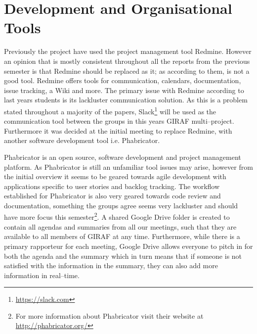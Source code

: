 \section{Development and Organisational Tools}
Previously the project have used the project management tool Redmine.
However an opinion that is mostly consistent throughout all the reports from the previous semester is that Redmine should be replaced as it;
as according to them, is not a good tool.
Redmine offers tools for communication, calendars, documentation, issue tracking, a Wiki and more.
The primary issue with Redmine according to last years students is its lackluster communication solution.
As this is a problem stated throughout a majority of the papers, Slack\footnote{\url{https://slack.com}} will be used as the communication tool between the groups in this years GIRAF multi--project.
Furthermore it was decided at the initial meeting to replace Redmine, with another software development tool i.e. Phabricator.

Phabricator is an open source, software development and project management platform.
As Phabricator is still an unfamiliar tool issues may arise, however from the initial overview it seems to be geared towards agile development with applications specific to user stories and backlog tracking.
The workflow established for Phabricator is also very geared towards code review and documentation, something the groups agree seems very lackluster and should have more focus this semester\footnote{For more information about Phabricator visit their website at \url{http://phabricator.org/}}.
A shared Google Drive folder is created to contain all agendas and summaries from all our meetings, such that they are available to all members of GIRAF at any time.
Furthermore, while there is a primary rapporteur for each meeting, Google Drive allows everyone to pitch in for both the agenda and the summary which in turn means that if someone is not satisfied with the information in the summary, they can also add more information in real--time.


